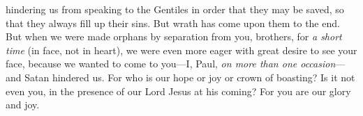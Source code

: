 \begin{biblechapter}
\verse hindering us from speaking to the Gentiles in order that they may be saved, so that they always fill up their sins. But wrath has come upon them to the end.
 But when we were made orphans by separation from you, brothers, for \textit{a short time} (in face, not in heart), we were even more eager with great desire to see your face,
\verse because we wanted to come to you—I, Paul, \textit{on more than one occasion}—and Satan hindered us.
\verse For who is our hope or joy or crown of boasting? Is it not even you, in the presence of our Lord Jesus at his coming?
\verse For you are our glory and joy.
\end{biblechapter}

